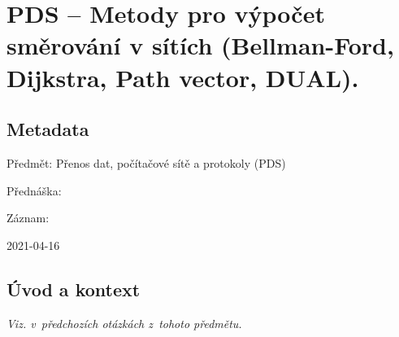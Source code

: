 

\graphicspath{{pds/teorie_smerovani/figures}}


\chapter{PDS -- Metody pro výpočet směrování v sítích (Bellman-Ford, Dijkstra, Path vector, DUAL).}


\section{Metadata}

\begin{compactitem}
    \item Předmět: Přenos dat, počítačové sítě a protokoly (PDS)
    \item Přednáška:
    \begin{compactitem}
        \item {}
    \end{compactitem}
    \item Záznam:
    \begin{compactitem}
        \item 2021-04-16
    \end{compactitem}
\end{compactitem}


\section{Úvod a kontext}

\textit{Viz.  v~předchozích otázkách z~tohoto předmětu.}

